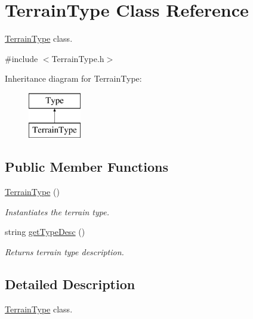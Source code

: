 \hypertarget{classTerrainType}{}\section{Terrain\+Type Class Reference}
\label{classTerrainType}


\hyperlink{classTerrainType}{Terrain\+Type} class.  




{\ttfamily \#include $<$Terrain\+Type.\+h$>$}

Inheritance diagram for Terrain\+Type\+:\begin{figure}[H]
\begin{center}
\leavevmode
\includegraphics[height=2.000000cm]{classTerrainType}
\end{center}
\end{figure}
\subsection*{Public Member Functions}
\begin{DoxyCompactItemize}
\item 
\mbox{\label{classTerrainType_aea114fb5e125b58bf9d9c9ab964749c7}} 
\hyperlink{classTerrainType_aea114fb5e125b58bf9d9c9ab964749c7}{Terrain\+Type} ()
\begin{DoxyCompactList}\small\item\em Instantiates the terrain type. \end{DoxyCompactList}\item 
string \hyperlink{classTerrainType_af24f4291676b6862c90b0d29598fcb11}{get\+Type\+Desc} ()
\begin{DoxyCompactList}\small\item\em Returns terrain type description. \end{DoxyCompactList}\end{DoxyCompactItemize}


\subsection{Detailed Description}
\hyperlink{classTerrainType}{Terrain\+Type} class. 

